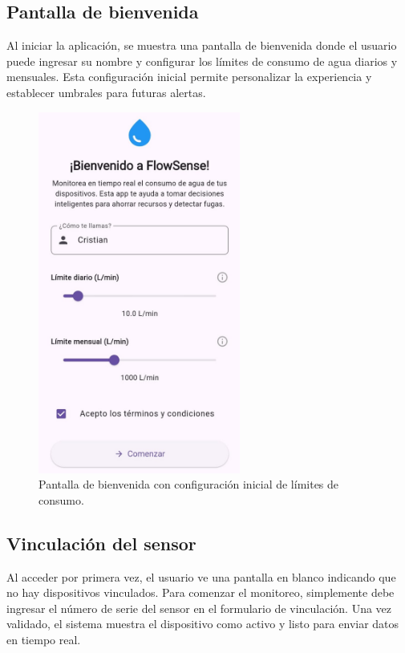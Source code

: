 \documentclass[conference]{IEEEtran}
\begin{document}
\subsection*{\textbf{Pantalla de bienvenida}}
Al iniciar la aplicación, se muestra una pantalla de bienvenida donde el usuario puede ingresar su nombre y configurar los límites de consumo de agua diarios y mensuales. Esta configuración inicial permite personalizar la experiencia y establecer umbrales para futuras alertas.



\begin{figure}[htbp]
    \centerline{\includegraphics[width=\linewidth, height=450px]{Prototipo1.jpeg}}
    \caption{Pantalla de bienvenida con configuración inicial de límites de consumo.}
    \label{fig}
\end{figure}

\newpage



\subsection*{\textbf{Vinculación del sensor}}
Al acceder por primera vez, el usuario ve una pantalla en blanco indicando que no hay dispositivos vinculados.
Para comenzar el monitoreo, simplemente debe ingresar el número de serie del sensor en el formulario de vinculación.
Una vez validado, el sistema muestra el dispositivo como activo y listo para enviar datos en tiempo real.
\end{document}

